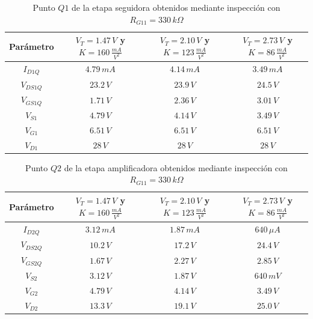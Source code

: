 \documentclass[10pt,spanish,a4paper,notitlepage]{article}
\begin{document}
\begin{table}[H]
\centering
\begin{tabular}{|c|c|c|c|} 
\hline
Parámetro & $V_{T}=1.47\,\unit{V}$ y $K=160\,\unit{\frac{mA}{V^2}}$ & 
$V_{T}=2.10\,\unit{V}$ y $K=123\,\unit{\frac{mA}{V^2}}$ &
$V_{T}=2.73\,\unit{V}$ y $K=86\,\unit{\frac{mA}{V^2}}$ \\ \hline
$I_{D1Q}$ & $4.79\,\unit{mA}$ & $4.14\,\unit{mA}$ & $3.49\,\unit{mA}$\\ \hline
$V_{DS1Q}$ & $23.2\,\unit{V}$ & $23.9\,\unit{V}$ & $24.5\,\unit{V}$\\ \hline
$V_{GS1Q}$ & $1.71\,\unit{V}$  & $2.36\,\unit{V}$ & $3.01\,\unit{V}$\\ \hline
$V_{S1}$ & $4.79\,\unit{V}$  & $4.14\,\unit{V}$ & $3.49\,\unit{V}$\\ \hline
$V_{G1}$ & $6.51\,\unit{V}$  & $6.51\,\unit{V}$ & $6.51\,\unit{V}$\\ \hline
$V_{D1}$ & $28\,\unit{V}$  & $28\,\unit{V}$ & $28\,\unit{V}$\\ \hline
\end{tabular}
\caption{Punto $Q1$ de la etapa seguidora obtenidos mediante inspección con $R_{G11} = 330\,\unit{k\Omega}$}
\label{table:B_calculo_modificado_seguidor}
\end{table}

\begin{table}[H]
\centering
\begin{tabular}{|c|c|c|c|} 
\hline
Parámetro & $V_{T}=1.47\,\unit{V}$ y $K=160\,\unit{\frac{mA}{V^2}}$ & 
$V_{T}=2.10\,\unit{V}$ y $K=123\,\unit{\frac{mA}{V^2}}$ &
$V_{T}=2.73\,\unit{V}$ y $K=86\,\unit{\frac{mA}{V^2}}$ \\ \hline
$I_{D2Q}$ & $3.12\,\unit{mA}$ & $1.87\,\unit{mA}$ & $640\,\unit{\mu A}$\\ \hline
$V_{DS2Q}$ & $10.2\,\unit{V}$ & $17.2\,\unit{V}$ & $24.4\,\unit{V}$\\ \hline
$V_{GS2Q}$ & $1.67\,\unit{V}$  & $2.27\,\unit{V}$ & $2.85\,\unit{V}$\\ \hline
$V_{S2}$ & $3.12\,\unit{V}$  & $1.87\,\unit{V}$ & $640\,\unit{mV}$\\ \hline
$V_{G2}$ & $4.79\,\unit{V}$  & $4.14\,\unit{V}$ & $3.49\,\unit{V}$\\ \hline
$V_{D2}$ & $13.3\,\unit{V}$  & $19.1\,\unit{V}$ & $25.0\,\unit{V}$\\ \hline
\end{tabular}
\caption{Punto $Q2$ de la etapa amplificadora obtenidos mediante inspección con $R_{G11} = 330\,\unit{k\Omega}$}
\label{table:B_calculo_modificado_amplificador}
\end{table}
\end{document}
